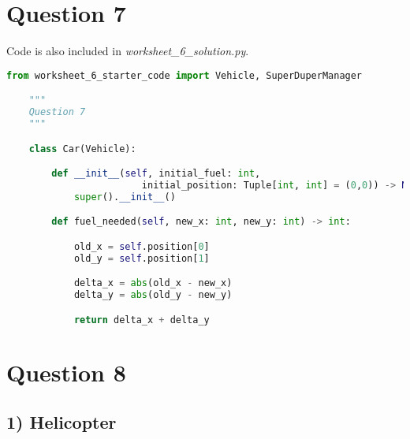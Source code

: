 \documentclass[12pt]{article}
\begin{document}
\section*{Question 7}

Code is also included in \textit{worksheet\_6\_solution.py}.

\begin{lstlisting}[language=Python]
    from worksheet_6_starter_code import Vehicle, SuperDuperManager

    """
    Question 7
    """

    class Car(Vehicle):

        def __init__(self, initial_fuel: int,
                        initial_position: Tuple[int, int] = (0,0)) -> None:
            super().__init__()

        def fuel_needed(self, new_x: int, new_y: int) -> int:

            old_x = self.position[0]
            old_y = self.position[1]

            delta_x = abs(old_x - new_x)
            delta_y = abs(old_y - new_y)

            return delta_x + delta_y

\end{lstlisting}

\section*{Question 8}

\subsection*{1) Helicopter}
\end{document}
